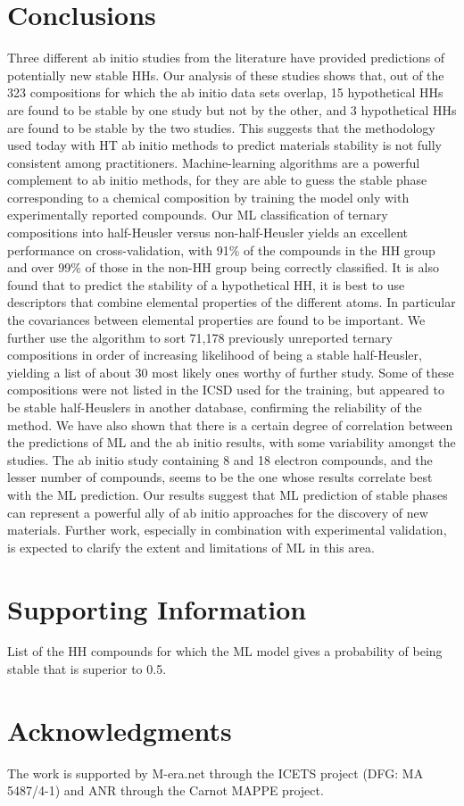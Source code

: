 \documentclass[pt10,journal=jacsat,manuscript=article,layout=twocolumn]{achemso}
\begin{document}
\section{Conclusions}



Three different ab initio studies from the literature have provided predictions of potentially new stable HHs. Our analysis of these studies shows that, out
of the 323 compositions for which the ab initio
data sets overlap, 15 hypothetical HHs are found to be stable by one study but not by the other, and 3 hypothetical HHs are found to be stable by the two studies. This suggests that the methodology used today with HT ab initio methods to predict materials stability is not fully consistent among practitioners. Machine-learning algorithms are a powerful complement to ab initio methods, for they are able to guess the stable phase corresponding to a chemical composition by training the model only with experimentally reported compounds. Our ML classification of ternary compositions into half-Heusler versus non-half-Heusler yields an excellent performance on cross-validation, with 91\% of the compounds in the HH group and over 99\% of those in the non-HH group being correctly classified. It is also found that to predict the stability of a hypothetical HH, it is best to use descriptors that combine elemental properties of the different atoms. In particular the covariances between elemental properties are found to be important. We further use the algorithm to sort 71,178 previously unreported ternary compositions in order of increasing likelihood of being a stable half-Heusler, yielding a list of about 30 most likely ones worthy of further study. Some of these compositions were not listed in the ICSD used for the training, but appeared to be stable half-Heuslers in another database, confirming the reliability of the method. We have also shown that there is a certain degree of correlation between the predictions of ML and the ab initio results, with some variability amongst the studies. The ab initio study containing 8 and 18 electron compounds, and the lesser number of compounds, seems to be the one whose results correlate best with the ML prediction. Our results suggest that ML prediction of stable phases can represent a powerful ally of ab initio approaches for the discovery of new materials. Further work, especially in combination with experimental validation, is expected to clarify the extent and limitations of ML in this area.


\section{Supporting Information}
List of the HH compounds for which the ML model gives a probability of being stable that is superior to 0.5.

\section{Acknowledgments}
The work is supported by M-era.net through the ICETS project (DFG: MA 5487/4-1) and
ANR through the Carnot MAPPE project.







\newpage
\end{document}
